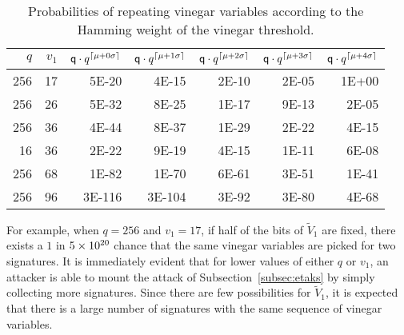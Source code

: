 \documentclass[12pt, a4paper, oneside]{memoir}
\DeclarePairedDelimiter{\ceil}{\lceil}{\rceil}
\theoremstyle{definition}
\begin{document}
\begin{table}[htbp]
  \renewcommand{\arraystretch}{1.2}
  \setlength{\tabcolsep}{7pt}
  \centering
  \caption{Probabilities of repeating vinegar variables according to the Hamming weight of the vinegar threshold.}\label{tab:bin-prob}
  \begin{tabular}{*{7}{r}}
    \toprule
    $q$ & $v_{1}$
      & $\mathsf{q} \cdot q^{\ceil{\mu + 0\sigma}}$
      & $\mathsf{q} \cdot q^{\ceil{\mu + 1\sigma}}$
      & $\mathsf{q} \cdot q^{\ceil{\mu + 2\sigma}}$
      & $\mathsf{q} \cdot q^{\ceil{\mu + 3\sigma}}$
      & $\mathsf{q} \cdot q^{\ceil{\mu + 4\sigma}}$ \\
    \midrule
    256 &  17 & \num{ 5E-20} & \num{ 4E-15} & \num{ 2E-10} & \num{ 2E-05} & \num{ 1E+00} \\
    256 &  26 & \num{ 5E-32} & \num{ 8E-25} & \num{ 1E-17} & \num{ 9E-13} & \num{ 2E-05} \\
    256 &  36 & \num{ 4E-44} & \num{ 8E-37} & \num{ 1E-29} & \num{ 2E-22} & \num{ 4E-15} \\
     16 &  36 & \num{ 2E-22} & \num{ 9E-19} & \num{ 4E-15} & \num{ 1E-11} & \num{ 6E-08} \\
    256 &  68 & \num{ 1E-82} & \num{ 1E-70} & \num{ 6E-61} & \num{ 3E-51} & \num{ 1E-41} \\
    256 &  96 & \num{3E-116} & \num{3E-104} & \num{ 3E-92} & \num{ 3E-80} & \num{ 4E-68} \\
    \bottomrule
  \end{tabular}
\end{table}

For example, when $q = 256$ and $v_{1} = 17$, if half of the bits of $\widetilde{V}_{1}$ are fixed, there exists a $1$ in $\num{5E+20}$ chance that the same vinegar variables are picked for two signatures. It is immediately evident that for lower values of either $q$ or $v_{1}$, an attacker is able to mount the attack of Subsection~\ref{subsec:etaks} by simply collecting more signatures. Since there are few possibilities for $\widetilde{V}_{1}$, it is expected that there is a large number of signatures with the same sequence of vinegar variables. 
\end{document}
